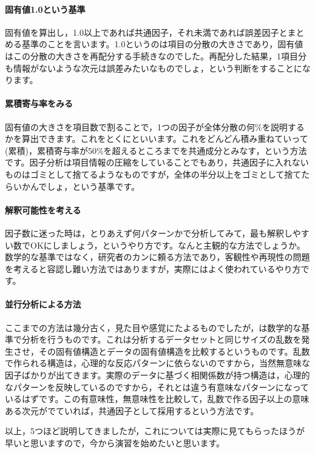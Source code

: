 \documentclass{ltjsbook}
\begin{document}
\paragraph{固有値1.0という基準}固有値を算出し，1.0以上であれば共通因子，それ未満であれば誤差因子とまとめる基準のことを言います。1.0というのは項目の分散の大きさであり，固有値はこの分散の大きさを再配分する手続きなのでした。再配分した結果，1項目分も情報がないような次元は誤差みたいなものでしょ，という判断をすることになります。
\paragraph{累積寄与率をみる}固有値の大きさを項目数で割ることで，1つの因子が全体分散の何\%を説明するかを算出できます。これをとくにといいます。これをどんどん積み重ねていって(累積)，累積寄与率が50\%を超えるところまでを共通成分とみなす，という方法です。因子分析は項目情報の圧縮をしていることでもあり，共通因子に入れないものはゴミとして捨てるようなものですが，全体の半分以上をゴミとして捨てたらいかんでしょ，という基準です。
\paragraph{解釈可能性を考える}因子数に迷った時は，とりあえず何パターンかで分析してみて，最も解釈しやすい数でOKにしましょう，というやり方です。なんと主観的な方法でしょうか。数学的な基準ではなく，研究者のカンに頼る方法であり，客観性や再現性の問題を考えると容認し難い方法ではありますが，実際にはよく使われているやり方です。
\paragraph{並行分析による方法}ここまでの方法は幾分古く，見た目や感覚にたよるものでしたが，は数学的な基準で分析を行うものです。これは分析するデータセットと同じサイズの乱数を発生させ，その固有値構造とデータの固有値構造を比較するというものです。乱数で作られる構造は，心理的な反応パターンに依らないのですから，当然無意味な因子ばかりが出てきます。実際のデータに基づく相関係数が持つ構造は，心理的なパターンを反映しているのですから，それとは違う有意味なパターンになっているはずです。この有意味性，無意味性を比較して，乱数で作る因子以上の意味ある次元がでていれば，共通因子として採用するという方法です。

以上，5つほど説明してきましたが，これについては実際に見てもらったほうが早いと思いますので，今から演習を始めたいと思います。
\end{document}
